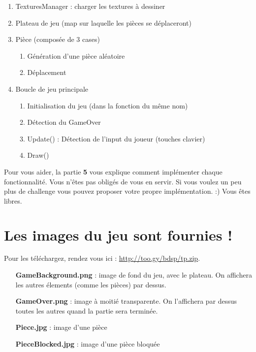 \documentclass[a4paper]{article}
\begin{document}
\begin{enumerate}
    \item TexturesManager : charger les textures à dessiner
    \item Plateau de jeu (map sur laquelle les pièces se déplaceront)
    \item Pièce (composée de 3 cases)
        \begin{enumerate}
            \item Génération d'une pièce aléatoire
            \item Déplacement
        \end{enumerate}
    \item Boucle de jeu principale
        \begin{enumerate}
            \item Initialisation du jeu (dans la fonction du même nom)
            \item Détection du GameOver
            \item Update() : Détection de l'input du joueur (touches clavier)
            \item Draw()
        \end{enumerate}
\end{enumerate}

\begin{center}
    {\large\color{red} Pour vous aider, la partie \textbf{5} vous explique
    comment implémenter chaque fonctionnalité. Vous n'êtes pas obligés de vous
    en servir. Si vous voulez un peu plus de challenge vous pouvez proposer
    votre propre implémentation. :) Vous êtes libres.}
\end{center}

\section{Les images du jeu sont fournies !}

Pour les téléchargez, rendez vous ici : \url{http://too.gy/bdsp/tp.zip}. \\

\begin{itemize}
    \item[\textbf{GameBackground.png}]: image de fond du jeu, avec le plateau. On affichera
        les autres élements (comme les pièces) par dessus. \\

    \item[\textbf{GameOver.png}]: image à moitié transparente. On l'affichera par dessus
        toutes les autres quand la partie sera terminée. \\

    \item[\textbf{Piece.jpg}]: image d'une pièce \\

    \item[\textbf{PieceBlocked.jpg}] : image d'une pièce bloquée
\end{itemize}
\end{document}
